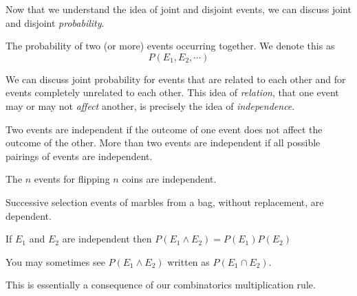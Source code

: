 \documentclass[main.tex]{subfiles}
\begin{document}
Now that we understand the idea of joint and disjoint events, we can discuss joint and disjoint \textit{probability}.

\begin{defn}
	The probability of two (or more) events occurring together. We denote this as \[P(E_1,E_2,\cdots)\]
\end{defn}

We can discuss joint probability for events that are related to each other and for events completely unrelated to each other. This idea of \textit{relation}, that one event may or may not \textit{affect} another, is precisely the idea of \textit{independence}.

\begin{defn}
	Two events are independent if the outcome of one event does not affect the outcome of the other. More than two events are independent if all possible pairings of events are independent.
\end{defn}

\begin{example}
	The \(n\) events for flipping \(n\) coins are independent.
\end{example}

\begin{example}
	Successive selection events of marbles from a bag, without replacement, are dependent.
\end{example}

\begin{thm}
	If \(E_1\) and \(E_2\) are independent then \(P(E_1 \land E_2) = P(E_1)P(E_2)\)
\end{thm}

\begin{rem}
	You may sometimes see \(P(E_1 \land E_2)\) written as \(P(E_1 \cap E_2)\).
\end{rem}

This is essentially a consequence of our combinatorics multiplication rule.

\end{document}
